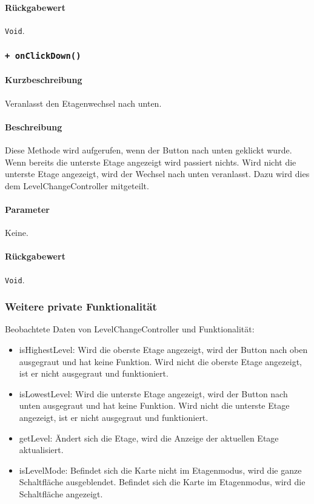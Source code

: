 \paragraph*{Rückgabewert}
\texttt{Void}.

\subsubsection*{\texttt{+ onClickDown()}}%
\paragraph*{Kurzbeschreibung}
Veranlasst den Etagenwechsel nach unten.
\paragraph*{Beschreibung}
Diese Methode wird aufgerufen, wenn der Button nach unten geklickt wurde. \\
Wenn bereits die unterste Etage angezeigt wird passiert nichts. 
Wird nicht die unterste Etage angezeigt, wird der Wechsel nach unten veranlasst.
Dazu wird dies dem LevelChangeController mitgeteilt.
\paragraph*{Parameter}
Keine.
\paragraph*{Rückgabewert}
\texttt{Void}.

\subsubsection*{Weitere private Funktionalität}%
Beobachtete Daten von LevelChangeController und Funktionalität:
\begin{itemize}
    \item isHighestLevel: Wird die oberste Etage angezeigt, wird der Button nach oben ausgegraut 
    und hat keine Funktion. Wird nicht die oberste Etage angezeigt, ist er nicht ausgegraut und funktioniert.
    \item isLowestLevel: Wird die unterste Etage angezeigt, wird der Button nach unten ausgegraut 
    und hat keine Funktion. Wird nicht die unterste Etage angezeigt, ist er nicht ausgegraut und funktioniert.
    \item getLevel: Ändert sich die Etage, wird die Anzeige der aktuellen Etage aktualisiert.
    \item isLevelMode: Befindet sich die Karte nicht im Etagenmodus, wird die ganze Schaltfläche ausgeblendet.
    Befindet sich die Karte im Etagenmodus, wird die Schaltfläche angezeigt.
\end{itemize}

